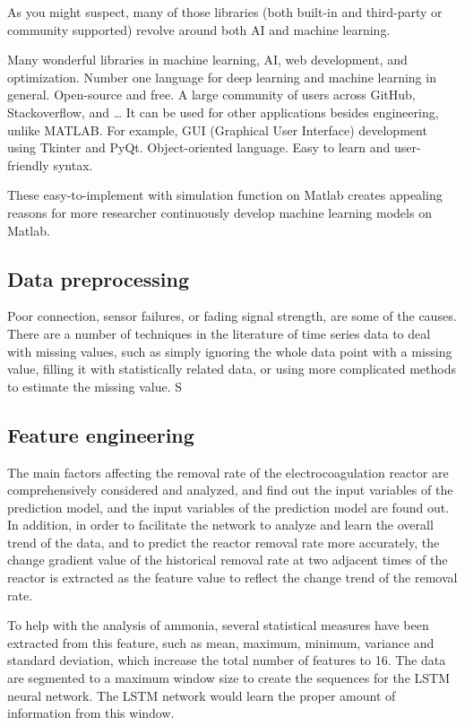 As you might suspect, many of those libraries (both built-in and third-party or community supported) revolve around both AI and machine learning.


Many wonderful libraries in machine learning, AI, web development, and optimization.
Number one language for deep learning and machine learning in general.
Open-source and free.
A large community of users across GitHub, Stackoverflow, and …
It can be used for other applications besides engineering, unlike MATLAB. For example, GUI (Graphical User Interface) development using Tkinter and PyQt.
Object-oriented language.
Easy to learn and user-friendly syntax.


These easy-to-implement with simulation function on Matlab creates appealing reasons for more researcher continuously develop machine learning models on Matlab. 




\subsection{Data preprocessing}
Poor connection, sensor failures, or fading signal strength, are some of the causes. There are a number of techniques in the literature of time series data to deal with missing values, such as simply ignoring the whole data point with a missing value, filling it with statistically related data, or using more complicated methods to estimate the missing value. S
\subsection{Feature engineering}
The main factors affecting the removal rate of the electrocoagulation reactor are comprehensively considered and analyzed, and find out the input variables of the prediction model, and the input variables of the prediction model are found out. In addition, in order to facilitate the network to analyze and learn the overall trend of the data, and to predict the reactor removal rate more accurately, the change gradient value of the historical removal rate at two adjacent times of the reactor is extracted as the feature value to reflect the change trend of the removal rate. \citep{zaghloulDevelopmentEnsembleMachine2021}

To help with the analysis of ammonia, several statistical measures have been extracted from this feature, such as mean, maximum, minimum, variance and standard deviation, which increase the total number of features to 16. The data are segmented to a maximum window size to create the sequences for the LSTM neural network. The LSTM network would learn the proper amount of information from this window. \citep{mamandipoorMonitoringDetectingFaults2020}